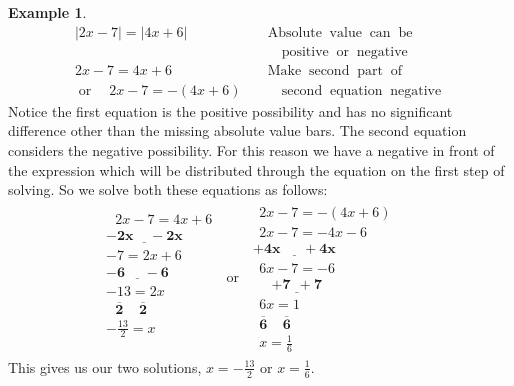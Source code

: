 \documentclass[12pt]{book}
\theoremstyle{definition}
\newtheorem{example}{Example}
\newcommand{\tmmathbf}[1]{\ensuremath{\boldsymbol{#1}}}
\newcommand{\tmop}[1]{\ensuremath{\operatorname{#1}}}
\begin{document}
\begin{example}\label{Lin41}
  \begin{eqnarray*}
    |2x - 7| = |4x + 6|  &  & \tmop{Absolute} \tmop{value} \tmop{can}
    \tmop{be}\\
		& & \tmop{~~~positive} \tmop{or} \tmop{negative}\\
    2 x - 7 = 4 x + 6~~~~~&  & \tmop{Make}
    \tmop{second} \tmop{part} \tmop{of}\\
		  \tmop{or~~~} 2 x - 7 = - (4 x + 6) & &\tmop{~~~second} \tmop{equation} \tmop{negative}
  \end{eqnarray*}
  Notice the first equation is the positive possibility and has no significant
  difference other than the missing absolute value bars. The second equation
  considers the negative possibility. For this reason we have a negative in
  front of the expression which will be distributed through the equation on
  the first step of solving. So we solve both these equations as follows:
  \begin{eqnarray*}
    \begin{array}{l}
      ~~~2 x - 7 = 4 x + 6\\
      \tmmathbf{\underline{- 2 x ~~~~~- 2 x}~~~}~~~~~\\
      - 7 = 2 x + 6\\
      \tmmathbf{\underline{- 6 ~~~~~~- 6}}\\
      - 13 = 2 x\\
      ~~~\tmmathbf{\overline{2} ~~~~~ \overline{2}}\\
      -\frac{13}{2} = x\\
    			~
		\end{array} \tmop{~or~} \begin{array}{l}
      ~~2 x - 7 = - (4 x + 6)\\
      ~~2 x - 7 = - 4 x - 6\\
      \tmmathbf{\underline{+ 4 x ~~~~~~~+ 4 x}}\\
      ~~6 x - 7 = - 6\\
      ~~~~~~\tmmathbf{ \underline{+ 7 ~~+ 7}}\\
      ~~6 x = 1\\
      ~~\tmmathbf{\overline{6} ~~~~~ \overline{6}}\\
      ~~x = \frac{1}{6}
    \end{array} &  & 
  \end{eqnarray*}
This gives us our two solutions, $x = -\frac{13}{2}$ or $x = \frac{1}{6}$.
\end{example}
\end{document}
